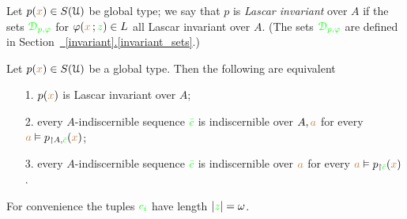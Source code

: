 \documentclass[creche.tex]{subfiles}
\begin{document}
Let $p({\color{brown} x})\in S(\EuScript U)$ be global type; we say that $p$ is \emph{Lascar invariant\/} over $A$ if the sets ${\color{green}\EuScript D_{p,\varphi}}$ for $\varphi({\color{brown} x}\,;{\color{green} z})\in L$ all Lascar invariant over $A$. (The sets ${\color{green}\EuScript D_{p,\varphi}}$ are defined in Section~\hyperref[invariant_sets]{~\ref*{invariant}.\ref*{invariant_sets}}.)

\begin{proposition}\label{prop_Lascar_indiscernibles}
  Let $p({\color{brown} x})\in S(\EuScript U)$ be a global type.
  Then the following are equivalent
  \begin{itemize}
    \item[1.] $p({\color{brown} x})$ is Lascar invariant over $A$;
    \item[2.] every $A$-indiscernible sequence ${\color{green}\bar c}$ is indiscernible over $A,{\color{brown} a}$ for every ${\color{brown} a}\vDash p_{\restriction A,{\color{green}\bar c}}({\color{brown} x})$;
    \item[3.] every $A$-indiscernible sequence ${\color{green}\bar c}$ is indiscernible over ${\color{brown} a}$ for every ${\color{brown} a}\vDash p_{\restriction {\color{green}\bar c}}({\color{brown} x})$.
  \end{itemize}
  For convenience the tuples ${\color{green} c_i}$ have length $|{\color{green} z}|=\omega$.
\end{proposition}
\end{document}
